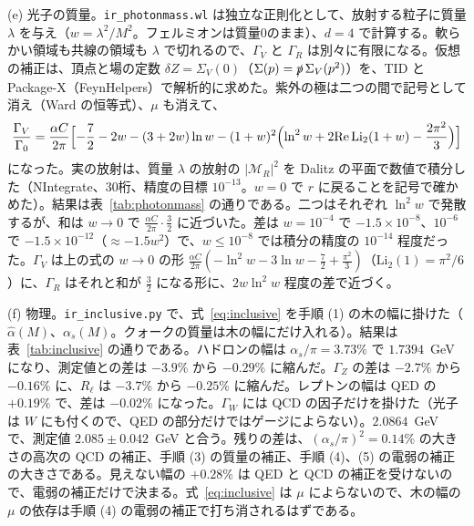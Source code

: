 \documentclass[a4paper,10pt]{ltjsarticle}
\newcommand{\re}{\mathrm{Re}\,}
\begin{document}
(e) 光子の質量。\texttt{ir\_photonmass.wl} は独立な正則化として、放射する粒子に質量 $\lambda$ を与え（$w=\lambda^2/M^2$。フェルミオンは質量0のまま）、$d=4$ で計算する。軟らかい領域も共線の領域も $\lambda$ で切れるので、$\Gamma_V$ と $\Gamma_R$ は別々に有限になる。仮想の補正は、頂点と場の定数 $\delta Z=\Sigma_V(0)$（$\Sigma(p)=\slashed p\,\Sigma_V(p^2)$）を、TID と Package-X（FeynHelpers）で解析的に求めた。紫外の極は二つの間で記号として消え（Ward の恒等式）、$\mu$ も消えて、
\begin{equation*}
\frac{\Gamma_V}{\Gamma_0}=\frac{\alpha C}{2\pi}\Bigl[-\frac72-2w-(3+2w)\ln w-(1+w)^2\Bigl(\ln^2w+2\re\mathrm{Li}_2(1+w)-\frac{2\pi^2}3\Bigr)\Bigr]
\end{equation*}
になった。実の放射は、質量 $\lambda$ の放射の $|\mathcal M_R|^2$ を Dalitz の平面で数値で積分した（NIntegrate、30桁、精度の目標 $10^{-13}$。$w=0$ で $r$ に戻ることを記号で確かめた）。結果は表~\ref{tab:photonmass} の通りである。二つはそれぞれ $\ln^2w$ で発散するが、和は $w\to0$ で $\frac{\alpha C}{2\pi}\cdot\frac32$ に近づいた。差は $w=10^{-4}$ で $-1.5\times10^{-8}$、$10^{-6}$ で $-1.5\times10^{-12}$（$\approx-1.5w^2$）で、$w\le10^{-8}$ では積分の精度の $10^{-14}$ 程度だった。$\Gamma_V$ は上の式の $w\to0$ の形 $\frac{\alpha C}{2\pi}(-\ln^2w-3\ln w-\frac72+\frac{\pi^2}3)$（$\mathrm{Li}_2(1)=\pi^2/6$）に、$\Gamma_R$ はそれと和が $\frac32$ になる形に、$2w\ln^2w$ 程度の差で近づく。

(f) 物理。\texttt{ir\_inclusive.py} で、式~\eqref{eq:inclusive} を手順 (1) の木の幅に掛けた（$\hat\alpha(M)$、$\alpha_s(M)$。クォークの質量は木の幅にだけ入れる）。結果は表~\ref{tab:inclusive} の通りである。ハドロンの幅は $\alpha_s/\pi=3.73\%$ で $1.7394$~GeV になり、測定値との差は $-3.9\%$ から $-0.29\%$ に縮んだ。$\Gamma_Z$ の差は $-2.7\%$ から $-0.16\%$ に、$R_\ell$ は $-3.7\%$ から $-0.25\%$ に縮んだ。レプトンの幅は QED の $+0.19\%$ で、差は $-0.02\%$ になった。$\Gamma_W$ には QCD の因子だけを掛けた（光子は $W$ にも付くので、QED の部分だけではゲージによらない）。$2.0864$~GeV で、測定値 $2.085\pm0.042$~GeV と合う。残りの差は、$(\alpha_s/\pi)^2=0.14\%$ の大きさの高次の QCD の補正、手順 (3) の質量の補正、手順 (4)、(5) の電弱の補正の大きさである。見えない幅の $+0.28\%$ は QED と QCD の補正を受けないので、電弱の補正だけで決まる。式~\eqref{eq:inclusive} は $\mu$ によらないので、木の幅の $\mu$ の依存は手順 (4) の電弱の補正で打ち消されるはずである。
\end{document}
